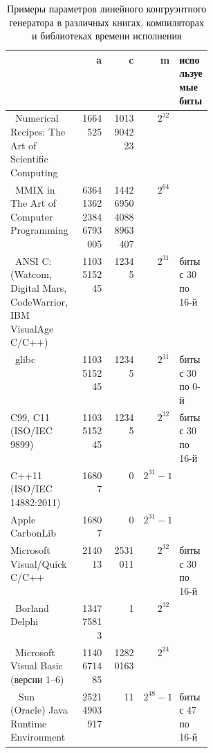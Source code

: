 \begin{landscape}
{\renewcommand{\arraystretch}{1.5}
\begin{table}[h]
\begin{tabular}{|p{0.34\linewidth}|r|r|r|l|}
\hline
									& a		& c		& m		& используемые биты	\\
\hline
\cite{Press:2007}~Numerical Recipes: The Art of Scientific Computing	& 1664525	& 1013904223	& $2^{32}$	& 			\\
\cite{Knuth:2005}~MMIX in The Art of Computer Programming & \tiny{6364136223846793005} & \tiny{1442695040888963407}	& $2^{64}$	&	\\
\hline
\cite{Entacher:1997}~ANSI C:
\tiny{(Watcom, Digital Mars, CodeWarrior, IBM VisualAge C/C++)}		& 1103515245	& 12345		& $2^{31}$	& биты с 30 по 16-й	\\
\cite{Sirca:Horvat:2012}~glibc						& 1103515245	& 12345		& $2^{31}$	& биты с 30 по 0-й	\\
C99, C11 (ISO/IEC 9899) 						& 1103515245	& 12345		& $2^{32}$	& биты с 30 по 16-й	\\
C++11 (ISO/IEC 14882:2011) 						& 16807		& 0		& $2^{31} - 1$	& 			\\
Apple CarbonLib             			                       	& 16807		& 0		& $2^{31} - 1$	& 			\\
Microsoft Visual/Quick C/C++                                    	& 214013	& 2531011	& $2^{32}$	& биты с 30 по 16-й	\\
\hline
\cite{Bucknall:2001}~Borland Delphi					& 134775813	& 1		& $2^{32}$	& \\
\cite{MS-VBRAND:2004}~Microsoft Visual Basic \tiny{(версии 1--6)}	& 1140671485	& 12820163	& $2^{24}$	& 			\\
\cite{Mak:2003}~ Sun (Oracle) Java Runtime Environment			& 25214903917	& 11		& $2^{48} - 1$	& биты с 47 по 16-й	\\
\hline
\end{tabular}
\caption{Примеры параметров линейного конгруэнтного генератора в различных книгах, компиляторах и библиотеках времени исполнения\label{table:lcg}}
\end{table}
}
\end{landscape}

